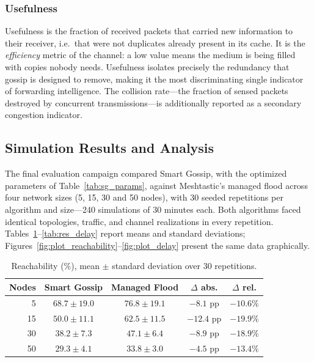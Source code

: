 \documentclass[english,bachelor]{tfgitic}[2026/01/22]
\begin{document}
\subsubsection{Usefulness}
 
Usefulness is the fraction of received packets that carried new information to their receiver, i.e.\ that were not duplicates already present in its cache. It is the \emph{efficiency} metric of the channel: a low value means the medium is being filled with copies nobody needs. Usefulness isolates precisely the redundancy that gossip is designed to remove, making it the most discriminating single indicator of forwarding intelligence. The collision rate---the fraction of sensed packets destroyed by concurrent transmissions---is additionally reported as a secondary congestion indicator.

\subsection{Simulation Results and Analysis}
\label{sec:sim_results}

The final evaluation campaign compared Smart Gossip, with the optimized parameters of Table~\ref{tab:sg_params}, against Meshtastic's managed flood across four network sizes (5, 15, 30 and 50 nodes), with 30 seeded repetitions per algorithm and size---240 simulations of 30 minutes each. Both algorithms faced identical topologies, traffic, and channel realizations in every repetition. Tables~\ref{tab:res_reach}--\ref{tab:res_delay} report means and standard deviations; Figures~\ref{fig:plot_reachability}--\ref{fig:plot_delay} present the same data graphically.
 
\begin{table}[htbp]
    \centering
    \caption{Reachability (\%), mean $\pm$ standard deviation over 30 repetitions.}
    \label{tab:res_reach}
    \begin{tabular}{rcccc}
        \toprule
        Nodes & Smart Gossip & Managed Flood & $\Delta$ abs. & $\Delta$ rel. \\
        \midrule
        5  & $68.7 \pm 19.0$ & $76.8 \pm 19.1$ & $-8.1$ pp  & $-10.6\%$ \\
        15 & $50.0 \pm 11.1$ & $62.5 \pm 11.5$ & $-12.4$ pp & $-19.9\%$ \\
        30 & $38.2 \pm 7.3$  & $47.1 \pm 6.4$  & $-8.9$ pp  & $-18.9\%$ \\
        50 & $29.3 \pm 4.1$  & $33.8 \pm 3.0$  & $-4.5$ pp  & $-13.4\%$ \\
        \bottomrule
    \end{tabular}
\end{table}
 
\end{document}
